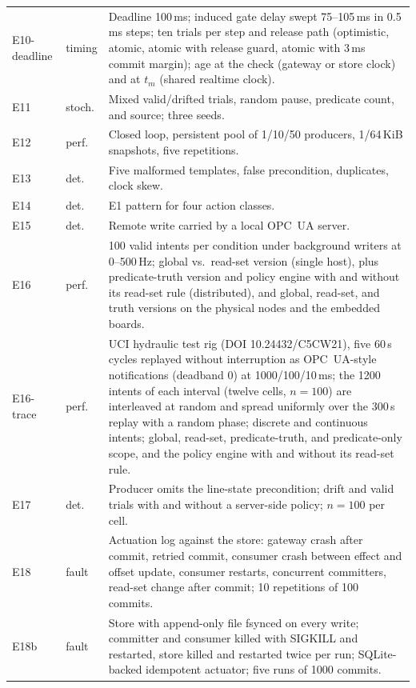 \documentclass[11pt]{article}
\begin{document}
{\begin{longtable}{@{}P{1.85cm}P{1.30cm}P{\dimexpr\linewidth-3.15cm-4\tabcolsep\relax}@{}}
E10-deadline & timing & Deadline 100\,ms; induced gate delay swept 75--105\,ms in 0.5\,ms steps; ten trials per step and release path (optimistic, atomic, atomic with release guard, atomic with 3\,ms commit margin); age at the check (gateway or store clock) and at $t_m$ (shared realtime clock). \\
E11 & stoch. & Mixed valid/drifted trials, random pause, predicate count, and source; three seeds. \\
E12 & perf. & Closed loop, persistent pool of 1/10/50 producers, 1/64\,KiB snapshots, five repetitions. \\
E13 & det. & Five malformed templates, false precondition, duplicates, clock skew. \\
E14 & det. & E1 pattern for four action classes. \\
E15 & det. & Remote write carried by a local OPC~UA server. \\
E16 & perf. & 100 valid intents per condition under background writers at 0--500\,Hz; global vs.\ read-set version (single host), plus predicate-truth version and policy engine with and without its read-set rule (distributed), and global, read-set, and truth versions on the physical nodes and the embedded boards. \\
E16-trace & perf. & UCI hydraulic test rig (DOI 10.24432/C5CW21), five 60\,s cycles replayed without interruption as OPC~UA-style notifications (deadband 0) at 1000/100/10\,ms; the 1200 intents of each interval (twelve cells, $n{=}100$) are interleaved at random and spread uniformly over the 300\,s replay with a random phase; discrete and continuous intents; global, read-set, predicate-truth, and predicate-only scope, and the policy engine with and without its read-set rule. \\
E17 & det. & Producer omits the line-state precondition; drift and valid trials with and without a server-side policy; $n{=}100$ per cell. \\
E18 & fault & Actuation log against the store: gateway crash after commit, retried commit, consumer crash between effect and offset update, consumer restarts, concurrent committers, read-set change after commit; 10 repetitions of 100 commits. \\
E18b & fault & Store with append-only file fsynced on every write; committer and consumer killed with SIGKILL and restarted, store killed and restarted twice per run; SQLite-backed idempotent actuator; five runs of 1000 commits. \\

\end{longtable}}
\end{document}
